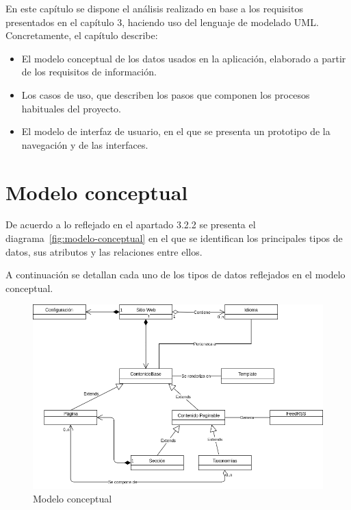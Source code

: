 En este capítulo se dispone el análisis realizado en base a los requisitos presentados
en el capítulo 3, haciendo uso del lenguaje de modelado UML. Concretamente,
el capítulo describe:

\begin{itemize}
\item El modelo conceptual de los datos usados en la aplicación, elaborado a
partir de los requisitos de información.
\item Los casos de uso, que describen los pasos que componen los procesos habituales del proyecto.
\item El modelo de interfaz de usuario, en el que se presenta un prototipo de la
navegación y de las interfaces.
\end{itemize}


\section{Modelo conceptual}

De acuerdo a lo reflejado en el apartado 3.2.2 se presenta el diagrama~\ref{fig:modelo-conceptual}  en el
que se identifican los principales tipos de datos, sus atributos y las relaciones entre
ellos.

A continuación se detallan cada uno de los tipos de datos reflejados en el modelo
conceptual.

\begin{figure}[htbp]
    \centering
    \includegraphics[width=1.1\textwidth]{4_analisis/modelo_conceptual}
    \caption{Modelo conceptual}
    \label{fig:modelo_conceptual}
\end{figure}

